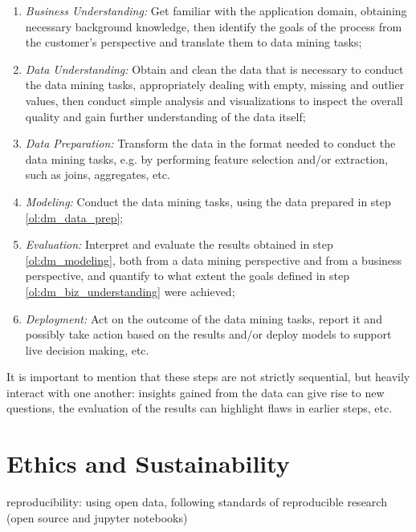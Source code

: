 \documentclass[12pt]{book}
\begin{document}
\begin{enumerate}
\item \emph{Business Understanding:} Get familiar with the application domain, obtaining necessary background knowledge, then identify the goals of the process from the customer's perspective and translate them to data mining tasks;
\label{ol:dm_biz_understanding}

\item \emph{Data Understanding:} Obtain and clean the data that is necessary to conduct the data mining tasks, appropriately dealing with empty, missing and outlier values, then conduct simple analysis and visualizations to inspect the overall quality and gain further understanding of the data itself;
\label{ol:dm_data_understanding}

\item \emph{Data Preparation:} Transform the data in the format needed to conduct the data mining tasks, e.g. by performing feature selection and/or extraction, such as joins, aggregates, etc.
\label{ol:dm_data_prep}

\item \emph{Modeling:} Conduct the data mining tasks, using the data prepared in step \ref{ol:dm_data_prep};
\label{ol:dm_modeling}

\item \emph{Evaluation:} Interpret and evaluate the results obtained in step \ref{ol:dm_modeling}, both from a data mining perspective and from a business perspective, and quantify to what extent the goals defined in step \ref{ol:dm_biz_understanding} were achieved;
\label{ol:dm_eval}

\item \emph{Deployment:} Act on the outcome of the data mining tasks, report it and possibly take action based on the results and/or deploy models to support live decision making, etc.
\label{ol:deploy}
\end{enumerate}

It is important to mention that these steps are not strictly sequential, but heavily interact with one another: insights gained from the data can give rise to new questions, the evaluation of the results can highlight flaws in earlier steps, etc.

\section{Ethics and Sustainability}
reproducibility: using open data, following standards of reproducible research (open source and jupyter notebooks)
\end{document}

